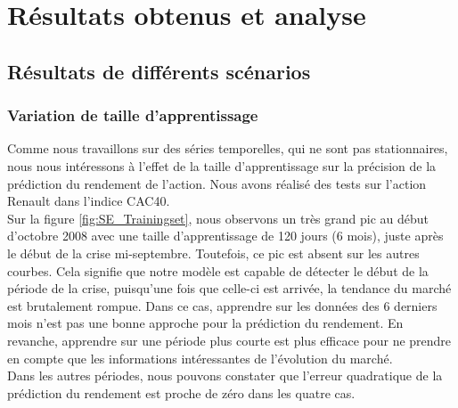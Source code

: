 
\section{Résultats obtenus et analyse}
 
\subsection{Résultats de différents scénarios}

\subsubsection{Variation de taille d'apprentissage}
Comme nous travaillons sur des séries temporelles, qui ne sont pas stationnaires, nous nous intéressons à l'effet de la taille d'apprentissage sur la précision de la prédiction du rendement de l'action. Nous avons réalisé des tests sur l'action Renault dans l'indice CAC40.\\

Sur la figure \ref{fig:SE_Trainingset}, nous observons un très grand pic au début d'octobre 2008 avec une taille d'apprentissage de 120 jours (6 mois), juste après le début de la crise mi-septembre. Toutefois, ce pic est absent sur les autres courbes. Cela signifie que notre modèle est capable de détecter le début de la période de la crise, puisqu'une fois que celle-ci est arrivée, la tendance du marché est brutalement rompue. Dans ce cas, apprendre sur les données des 6 derniers mois n'est pas une bonne approche pour la prédiction du rendement. En revanche, apprendre sur une période plus courte est plus efficace pour ne prendre en compte que les informations intéressantes de l'évolution du marché.\\

Dans les autres périodes, nous pouvons constater que l'erreur quadratique de la prédiction du rendement est proche de zéro dans les quatre cas.

